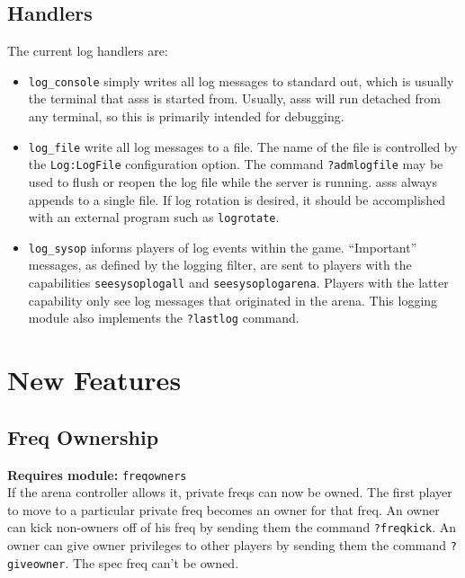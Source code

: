 \documentclass{article}
\newcommand{\asss}{asss}
\newcommand{\requiremod}[1]{\noindent\textbf{Requires module:} \texttt{#1}\\}
\begin{document}
\subsection{Handlers}

The current log handlers are:

\begin{itemize}

\item{\verb/log_console/} simply writes all log messages to standard
out, which is usually the terminal that \asss{} is started from.
Usually, \asss{} will run detached from any terminal, so this is
primarily intended for debugging.

\item{\verb/log_file/} write all log messages to a file. The name of the
file is controlled by the \verb/Log:LogFile/ configuration option. The
command \verb/?admlogfile/ may be used to flush or reopen the log file
while the server is running. \asss{} always appends to a single file. If
log rotation is desired, it should be accomplished with an external
program such as \verb/logrotate/.

\item{\verb/log_sysop/} informs players of log events within the game.
``Important'' messages, as defined by the logging filter, are sent to
players with the capabilities \verb/seesysoplogall/ and
\verb/seesysoplogarena/. Players with the latter capability only see log
messages that originated in the arena. This logging module also
implements the \verb/?lastlog/ command.

\end{itemize}


\section{New Features}

\subsection{Freq Ownership}

\requiremod{freqowners}
If the arena controller allows it, private freqs can now be owned. The
first player to move to a particular private freq becomes an owner for
that freq. An owner can kick non-owners off of his freq by sending them
the command \verb/?freqkick/. An owner can give owner privileges to
other players by sending them the command \verb/?giveowner/. The spec
freq can't be owned.
\end{document}
